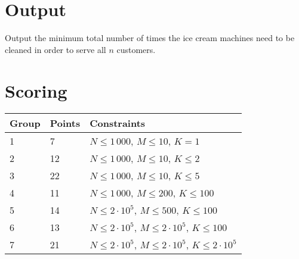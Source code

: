 \section*{Output}
Output the minimum total number of times the ice cream machines need to be
cleaned in order to serve all $n$ customers.

\section*{Scoring}
\begin{tabular}{|l|l|l|}
    \hline
    Group & Points & Constraints \\ \hline
    1     &  7   & $N \leq 1\,000$,          $M \leq 10$, $K = 1$ \\ \hline %
    2     &  12  & $N \leq 1\,000$,          $M \leq 10$, $K \leq 2$ \\ \hline %
    3     &  22  & $N \leq 1\,000$,          $M \leq 10$, $K \leq 5$ \\ \hline %
    4     &  11  & $N \leq 1\,000$,         $M \leq 200$, $K \leq 100$ \\ \hline %
    5     &  14  & $N \leq 2 \cdot 10^5$, $M \leq 500$, $K \leq 100$ \\ \hline %
    6     &  13  & $N \leq 2 \cdot 10^5$, $M \leq 2 \cdot 10^5$, $K \leq 100$ \\ \hline %
    7     &  21  & $N \leq 2 \cdot 10^5$, $M \leq 2 \cdot 10^5$, $K \leq 2 \cdot 10^5$ \\ \hline %
\end{tabular}

